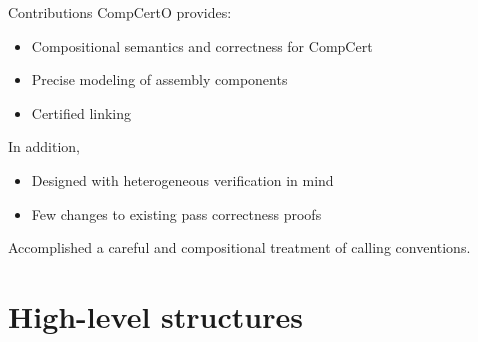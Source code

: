 \documentclass[aspectratio=169,mathserif]{beamer}
\begin{document}
\begin{frame}{Contributions}
CompCertO provides:
\begin{itemize}
  \item Compositional semantics and correctness for CompCert
  \item Precise modeling of assembly components
  \item Certified linking
\end{itemize}

\vspace{1em}
In addition,
\begin{itemize}
  \item Designed with heterogeneous verification in mind
  \item Few changes to existing pass correctness proofs
\end{itemize}

\vspace{1em}
Accomplished a careful and compositional treatment
of calling conventions.
\end{frame}


\section{High-level structures} %
\end{document}
